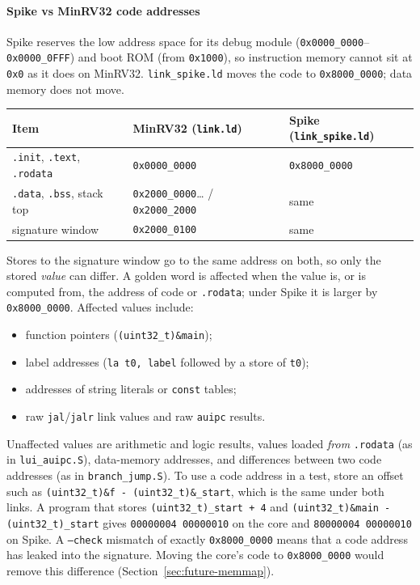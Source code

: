 \paragraph{Spike vs MinRV32 code addresses}
\label{sec:spike-addr}
Spike reserves the low address space for its debug module
(\texttt{0x0000\_0000}--\texttt{0x0000\_0FFF}) and boot ROM (from
\texttt{0x1000}), so instruction memory cannot sit at \texttt{0x0} as it does on
MinRV32. \texttt{link\_spike.ld} moves the code to \texttt{0x8000\_0000};
data memory does not move.

\begin{center}
\begin{tabularx}{\linewidth}{@{}X l l@{}}
\toprule
Item & MinRV32 (\texttt{link.ld}) & Spike (\texttt{link\_spike.ld}) \\
\midrule
\texttt{.init}, \texttt{.text}, \texttt{.rodata} & \texttt{0x0000\_0000} & \texttt{0x8000\_0000} \\
\texttt{.data}, \texttt{.bss}, stack top & \texttt{0x2000\_0000}\ldots{} / \texttt{0x2000\_2000} & same \\
signature window & \texttt{0x2000\_0100} & same \\
\bottomrule
\end{tabularx}
\end{center}

Stores to the signature window go to the same address on both, so only the
stored \emph{value} can differ. A golden word is affected when the value is, or is
computed from, the address of code or \texttt{.rodata}; under Spike it is larger
by \texttt{0x8000\_0000}. Affected values include:
\begin{itemize}[leftmargin=*]
  \item function pointers (\texttt{(uint32\_t)\&main});
  \item label addresses (\texttt{la t0, label} followed by a store of \texttt{t0});
  \item addresses of string literals or \texttt{const} tables;
  \item raw \texttt{jal}/\texttt{jalr} link values and raw \texttt{auipc} results.
\end{itemize}
Unaffected values are arithmetic and logic results, values loaded \emph{from}
\texttt{.rodata} (as in \texttt{lui\_auipc.S}), data-memory addresses, and
differences between two code addresses (as in \texttt{branch\_jump.S}). To use a
code address in a test, store an offset such as
\texttt{(uint32\_t)\&f - (uint32\_t)\&\_start}, which is the same under both
links. A program that stores \texttt{(uint32\_t)\_start + 4} and
\texttt{(uint32\_t)\&main - (uint32\_t)\_start} gives
\texttt{00000004 00000010} on the core and \texttt{80000004 00000010} on Spike.
A \texttt{--check} mismatch of exactly \texttt{0x8000\_0000} means that a code
address has leaked into the signature. Moving the core's code to
\texttt{0x8000\_0000} would remove this difference
(Section~\ref{sec:future-memmap}).

